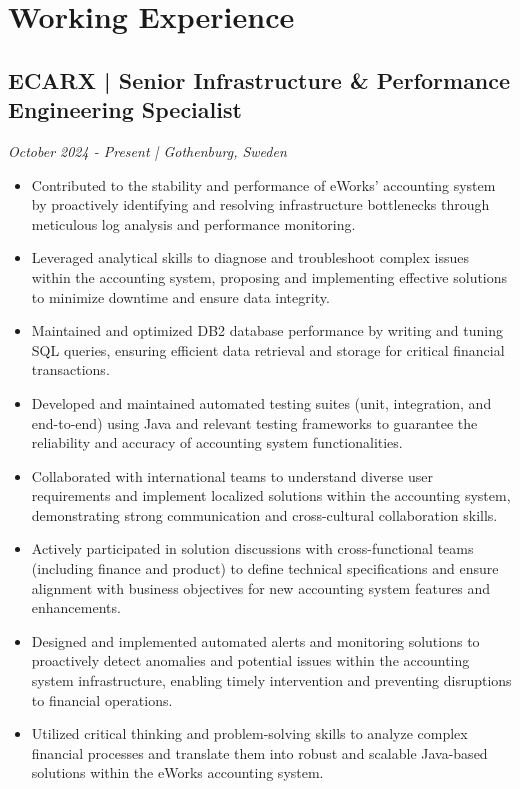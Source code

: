 \documentclass[10pt,a4paper]{article}
\begin{document}
\section*{Working Experience}

\subsection*{ECARX | Senior Infrastructure \& Performance Engineering Specialist}
\textit{October 2024 - Present | Gothenburg, Sweden}
\begin{itemize}[noitemsep]
\item Contributed to the stability and performance of eWorks' accounting system by proactively identifying and resolving infrastructure bottlenecks through meticulous log analysis and performance monitoring.
\item Leveraged analytical skills to diagnose and troubleshoot complex issues within the accounting system, proposing and implementing effective solutions to minimize downtime and ensure data integrity.
\item Maintained and optimized DB2 database performance by writing and tuning SQL queries, ensuring efficient data retrieval and storage for critical financial transactions.
\item Developed and maintained automated testing suites (unit, integration, and end-to-end) using Java and relevant testing frameworks to guarantee the reliability and accuracy of accounting system functionalities.
\item Collaborated with international teams to understand diverse user requirements and implement localized solutions within the accounting system, demonstrating strong communication and cross-cultural collaboration skills.
\item Actively participated in solution discussions with cross-functional teams (including finance and product) to define technical specifications and ensure alignment with business objectives for new accounting system features and enhancements.
\item Designed and implemented automated alerts and monitoring solutions to proactively detect anomalies and potential issues within the accounting system infrastructure, enabling timely intervention and preventing disruptions to financial operations.
\item Utilized critical thinking and problem-solving skills to analyze complex financial processes and translate them into robust and scalable Java-based solutions within the eWorks accounting system.
\end{itemize}
\end{document}
